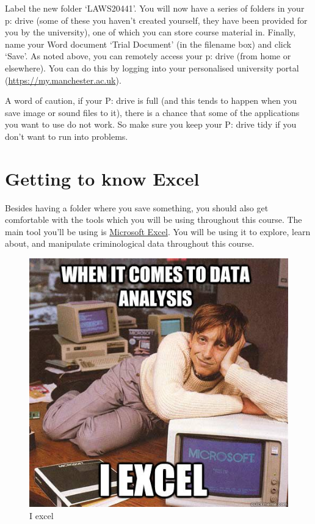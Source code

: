 \documentclass[]{book}
\theoremstyle{definition}
\theoremstyle{definition}
\theoremstyle{definition}
\theoremstyle{remark}
\begin{document}
{ Label the new folder `LAWS20441'. You will now have a series of
folders in your p: drive (some of these you haven't created yourself,
they have been provided for you by the university), one of which you can
store course material in. Finally, name your Word document `Trial
Document' (in the filename box) and click `Save'. As noted above, you
can remotely access your p: drive (from home or elsewhere). You can do
this by logging into your personalised university portal
(\url{https://my.manchester.ac.uk}). }

A word of caution, if your P: drive is full (and this tends to happen
when you save image or sound files to it), there is a chance that some
of the applications you want to use do not work. So make sure you keep
your P: drive tidy if you don't want to run into problems.

\hypertarget{getting-to-know-excel}{%
\section{Getting to know Excel}\label{getting-to-know-excel}}

Besides having a folder where you save something, you should also get
comfortable with the tools which you will be using throughout this
course. The main tool you'll be using is
\href{https://en.wikipedia.org/wiki/Microsoft_Excel}{Microsoft Excel}.
You will be using it to explore, learn about, and manipulate
criminological data throughout this course.

\begin{figure}
\centering
\includegraphics{imgs/bill_gates_excel.jpg}
\caption{I excel}
\end{figure}
\end{document}
